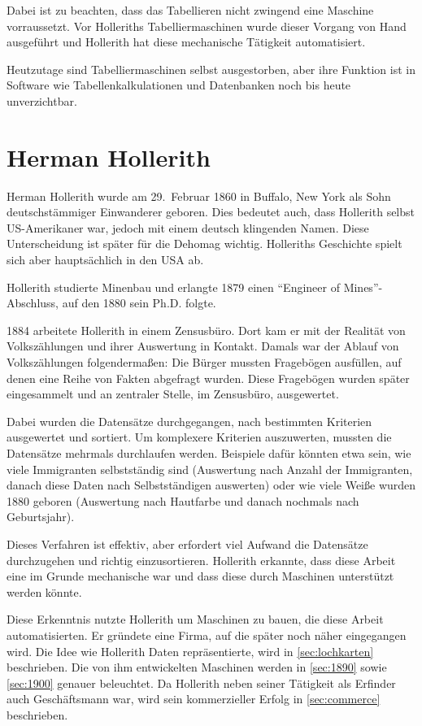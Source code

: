 \documentclass[parskip=half]{scrartcl}
\begin{document}
Dabei ist zu beachten, dass das Tabellieren nicht zwingend eine Maschine
vorraussetzt. Vor Holleriths Tabelliermaschinen wurde dieser Vorgang von Hand
ausgeführt und Hollerith hat diese mechanische Tätigkeit automatisiert.

Heutzutage sind Tabelliermaschinen selbst ausgestorben, aber ihre Funktion ist
in Software wie Tabellenkalkulationen und Datenbanken noch bis heute
unverzichtbar.

\section{Herman Hollerith}
\label{sec:hollerith}

Herman Hollerith wurde am 29.~Februar 1860 in Buffalo, New York als
Sohn deutschstämmiger Einwanderer geboren. Dies bedeutet auch, dass Hollerith selbst
US-Amerikaner war, jedoch mit einem deutsch klingenden Namen. Diese
Unterscheidung ist später für die Dehomag wichtig. Holleriths Geschichte spielt sich aber hauptsächlich in den USA ab.

Hollerith studierte Minenbau und erlangte 1879 einen \enquote{Engineer of
Mines}-Abschluss, auf den 1880 sein Ph.D. folgte.



1884 arbeitete Hollerith in einem Zensusbüro. Dort kam er mit der Realität von
Volkszählungen und ihrer Auswertung in Kontakt. Damals war der Ablauf von Volkszählungen folgendermaßen: Die Bürger mussten Fragebögen ausfüllen, auf denen eine Reihe von Fakten
abgefragt wurden. Diese Fragebögen wurden später eingesammelt und an zentraler
Stelle, im Zensusbüro, ausgewertet.

Dabei wurden die Datensätze durchgegangen, nach bestimmten Kriterien
ausgewertet und sortiert. Um komplexere Kriterien auszuwerten, mussten die
Datensätze mehrmals durchlaufen werden. Beispiele dafür könnten etwa sein, wie viele
Immigranten selbstständig sind (Auswertung nach Anzahl der Immigranten, danach
diese Daten nach Selbstständigen auswerten) oder wie viele Weiße wurden 1880
geboren (Auswertung nach Hautfarbe und danach nochmals nach Geburtsjahr).

Dieses Verfahren ist effektiv, aber erfordert viel Aufwand die Datensätze
durchzugehen und richtig einzusortieren. Hollerith erkannte, dass diese Arbeit
eine im Grunde mechanische war und dass diese durch Maschinen unterstützt
werden könnte.

Diese Erkenntnis nutzte Hollerith um Maschinen zu bauen, die diese Arbeit
automatisierten. Er gründete eine Firma, auf die später noch näher eingegangen wird. Die Idee wie Hollerith Daten repräsentierte, wird in
\autoref{sec:lochkarten} beschrieben. Die von ihm entwickelten Maschinen werden
in \autoref{sec:1890} sowie \autoref{sec:1900} genauer beleuchtet. Da Hollerith
neben seiner Tätigkeit als Erfinder auch Geschäftsmann war, wird sein
kommerzieller Erfolg in \autoref{sec:commerce} beschrieben.
\end{document}
